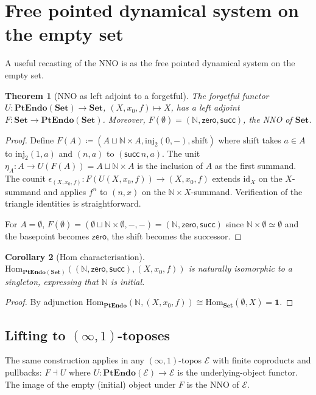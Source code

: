 \documentclass[12pt]{article}
\newtheorem{theorem}{Theorem}[section]
\newtheorem{corollary}[theorem]{Corollary}
\theoremstyle{definition}
\theoremstyle{remark}
\newcommand{\N}{\mathbb{N}}
\newcommand{\Set}{\mathbf{Set}}
\newcommand{\id}{\mathrm{id}}
\newcommand{\zero}{\mathsf{zero}}
\newcommand{\suc}{\mathsf{succ}}
\newcommand{\PtEndo}{\mathbf{PtEndo}}
\newcommand{\iso}{\cong}
\begin{document}
\section{Free pointed dynamical system on the empty set}\label{sec:free}

A useful recasting of the NNO is as the free pointed dynamical system on the empty set.

\begin{theorem}[NNO as left adjoint to a forgetful]\label{thm:free-pte}
The forgetful functor $U\colon \PtEndo(\Set)\to \Set$, $(X,x_{0},f)\mapsto X$, has a left adjoint $F\colon \Set\to\PtEndo(\Set)$. Moreover, $F(\emptyset)=(\N,\zero,\suc)$, the NNO of $\Set$.
\end{theorem}

\begin{proof}
Define $F(A)\coloneqq (A\sqcup\N\times A, \mathrm{inj}_{2}(0,-), \mathrm{shift})$ where $\mathrm{shift}$ takes $a\in A$ to $\mathrm{inj}_{2}(1,a)$ and $(n,a)$ to $(\suc\,n,a)$. The unit $\eta_{A}\colon A\to U(F(A))=A\sqcup\N\times A$ is the inclusion of $A$ as the first summand. The counit $\epsilon_{(X,x_{0},f)}\colon F(U(X,x_{0},f))\to (X,x_{0},f)$ extends $\id_{X}$ on the $X$-summand and applies $f^{n}$ to $(n,x)$ on the $\N\times X$-summand. Verification of the triangle identities is straightforward.

For $A=\emptyset$, $F(\emptyset)=(\emptyset\sqcup\N\times\emptyset,-,-)=(\N,\zero,\suc)$ since $\N\times\emptyset\simeq\emptyset$ and the basepoint becomes $\zero$, the shift becomes the successor.
\end{proof}

\begin{corollary}[Hom characterisation]\label{cor:hom-char}
$\mathrm{Hom}_{\PtEndo(\Set)}((\N,\zero,\suc),(X,x_{0},f))$ is naturally isomorphic to a singleton, expressing that $\N$ is initial.
\end{corollary}

\begin{proof}
By adjunction $\mathrm{Hom}_{\PtEndo}(\N,(X,x_{0},f))\iso\mathrm{Hom}_{\Set}(\emptyset,X)=\mathbf{1}$.
\end{proof}

\subsection{Lifting to \texorpdfstring{$(\infty,1)$}{(infinity,1)}-toposes}

The same construction applies in any $(\infty,1)$-topos $\mathcal{E}$ with finite coproducts and pullbacks: $F\dashv U$ where $U\colon \PtEndo(\mathcal{E})\to \mathcal{E}$ is the underlying-object functor. The image of the empty (initial) object under $F$ is the NNO of $\mathcal{E}$.
\end{document}
